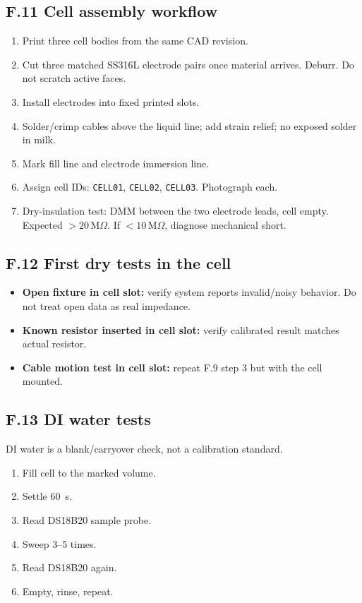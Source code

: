 \documentclass[11pt,a4paper]{article}
\newcommand{\Mohm}[1]{\ensuremath{#1\,\mathrm{M}\Omega}}
\begin{document}
\subsection{F.11 Cell assembly workflow}

\begin{enumerate}
\item Print three cell bodies from the same CAD revision.
\item Cut three matched SS316L electrode pairs once material arrives. Deburr. Do not scratch active faces.
\item Install electrodes into fixed printed slots.
\item Solder/crimp cables above the liquid line; add strain relief; no exposed solder in milk.
\item Mark fill line and electrode immersion line.
\item Assign cell IDs: \texttt{CELL01}, \texttt{CELL02}, \texttt{CELL03}. Photograph each.
\item Dry-insulation test: DMM between the two electrode leads, cell empty. Expected $>\Mohm{20}$. If $<\Mohm{10}$, diagnose mechanical short.
\end{enumerate}

\subsection{F.12 First dry tests in the cell}

\begin{itemize}
\item \textbf{Open fixture in cell slot:} verify system reports invalid/noisy behavior. Do not treat open data as real impedance.
\item \textbf{Known resistor inserted in cell slot:} verify calibrated result matches actual resistor.
\item \textbf{Cable motion test in cell slot:} repeat F.9 step 3 but with the cell mounted.
\end{itemize}

\subsection{F.13 DI water tests}

DI water is a blank/carryover check, not a calibration standard.

\begin{enumerate}
\item Fill cell to the marked volume.
\item Settle \SI{60}{\second}.
\item Read DS18B20 sample probe.
\item Sweep 3--5 times.
\item Read DS18B20 again.
\item Empty, rinse, repeat.
\end{enumerate}
\end{document}
